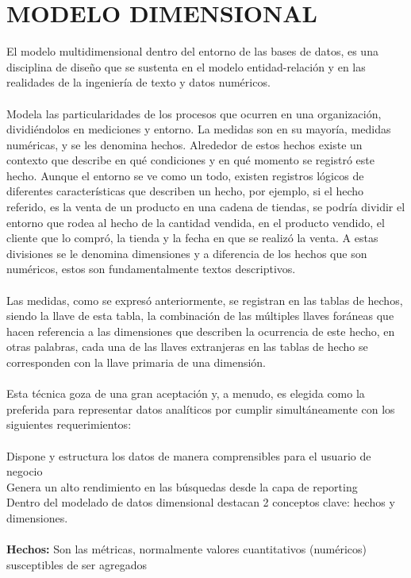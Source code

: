 \section{MODELO DIMENSIONAL}
El modelo multidimensional dentro del entorno de las bases de datos, es una disciplina de diseño que se sustenta en el modelo entidad-relación y en las realidades de la ingeniería de texto y datos numéricos.\\\\ 
Modela las particularidades de los procesos que  ocurren en una organización, dividiéndolos en mediciones y entorno. La medidas son en su mayoría, medidas numéricas, y se les denomina hechos. Alrededor de estos hechos existe un contexto que describe en qué condiciones y en qué momento se registró este hecho. Aunque el entorno se ve como un todo, existen registros lógicos de diferentes características que describen un hecho, por ejemplo, si el hecho referido, es la venta de un producto en una cadena de tiendas, se podría dividir el entorno que rodea al hecho de la cantidad vendida, en el producto vendido, el cliente que lo compró, la tienda y la fecha en que se realizó la venta. A estas divisiones se le denomina dimensiones y a diferencia de los hechos que son numéricos, estos son fundamentalmente textos descriptivos.\\\\ 
Las medidas, como se  expresó anteriormente, se registran en las tablas de hechos, siendo la llave de esta tabla, la combinación de las múltiples llaves foráneas que hacen referencia   a las dimensiones que describen la ocurrencia de este hecho, en otras palabras, cada una de las llaves extranjeras en las tablas de hecho se corresponden con la llave primaria de una dimensión.\\\\ 
Esta técnica goza de una gran aceptación y, a menudo, es elegida como la preferida para representar datos analíticos por cumplir simultáneamente con los siguientes requerimientos:\\\\ 
Dispone y estructura los datos de manera comprensibles para el usuario de negocio\\
Genera un alto rendimiento en las búsquedas desde la capa de reporting\\
Dentro del modelado de datos dimensional destacan 2 conceptos clave: hechos y dimensiones.\\\\
\textbf{Hechos:} Son las métricas, normalmente valores cuantitativos (numéricos) susceptibles de ser agregados\\
